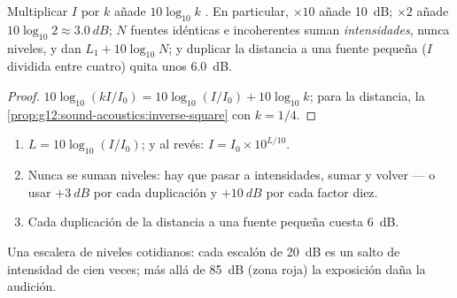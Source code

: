 \begin{proposition}\label{prop:g12:sound-acoustics:db-arithmetic}
Multiplicar $I$ por $k$ añade $10\log_{10}k$ . En particular,
$\times 10$ añade \qty{10}{dB}; $\times 2$ añade
$10\log_{10}2 \approx \qty{3.0}{dB}$; $N$ fuentes idénticas e
incoherentes suman \emph{intensidades}, nunca niveles, y dan
$L_1 + 10\log_{10}N$; y duplicar la distancia a una fuente pequeña ($I$
dividida entre cuatro) quita unos \qty{6.0}{dB}.
\end{proposition}

\begin{proof}
$10\log_{10}(kI/I_0) = 10\log_{10}(I/I_0) + 10\log_{10}k$; para la
distancia, la \cref{prop:g12:sound-acoustics:inverse-square} con
$k = 1/4$.
\end{proof}

\begin{method}\label{met:g12:sound-acoustics:db}
\begin{enumerate}
  \item $L = 10\log_{10}(I/I_0)$; y al revés: $I = I_0 \times 10^{L/10}$.
  \item Nunca se suman niveles: hay que pasar a intensidades, sumar y
        volver --- o usar $+\qty{3}{dB}$ por cada duplicación y
        $+\qty{10}{dB}$ por cada factor diez.
  \item Cada duplicación de la distancia a una fuente pequeña cuesta
        \qty{6}{dB}.
\end{enumerate}
\end{method}

\begin{omfigure}

{\small Una escalera de niveles cotidianos: cada escalón de
\qty{20}{dB} es un salto de intensidad de cien veces; más allá de
\qty{85}{dB} (zona roja) la exposición daña la audición.}
\end{omfigure}

